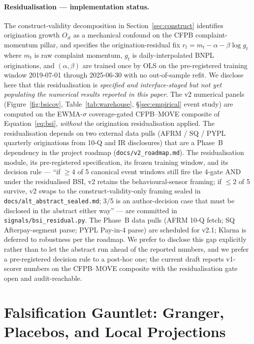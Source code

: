 \documentclass[11pt,letterpaper]{article}
\begin{document}
\paragraph{Residualisation --- implementation status.}
The construct-validity decomposition in Section~\ref{sec:construct}
identifies origination growth $O_{it}$ as a mechanical confound on
the CFPB complaint-momentum pillar, and specifies the
origination-residual fix
\mbox{$r_t = m_t - \alpha - \beta \log g_t$} where $m_t$ is raw
complaint momentum, $g_t$ is daily-interpolated BNPL originations,
and $(\alpha,\beta)$ are trained once by OLS on the pre-registered
training window \mbox{2019-07-01} through \mbox{2025-06-30} with no
out-of-sample refit. We disclose here that this residualisation is
\emph{specified and interface-staged but not yet populating the
numerical results reported in this paper}. The v2 numerical panels
(Figure~\ref{fig:bsicov}, Table~\ref{tab:warehouse},
\S\ref{sec:empirical} event study) are computed on the EWMA-$\sigma$
coverage-gated CFPB--MOVE composite of Equation~\eqref{eq:bsi},
\emph{without} the origination residualisation applied. The
residualisation depends on two external data pulls
(AFRM / SQ / PYPL quarterly originations from 10-Q and IR
disclosures) that are a Phase~B dependency in the project roadmap
(\texttt{docs/v2\_roadmap.md}). The residualisation module, its
pre-registered specification, its frozen training window, and its
decision rule --- ``if $\ge 4$ of 5 canonical event windows still
fire the 4-gate AND under the residualised BSI, v2 retains the
behavioural-sensor framing; if $\le 2$ of 5 survive, v2 swaps to
the construct-validity-only framing sealed in
\texttt{docs/alt\_abstract\_sealed.md}; 3/5 is an author-decision
case that must be disclosed in the abstract either way'' --- are
committed in \texttt{signals/bsi\_residual.py}. The Phase~B data
pulls (AFRM 10-Q fetch; SQ Afterpay-segment parse; PYPL Pay-in-4
parse) are scheduled for v2.1; Klarna is deferred to robustness
per the roadmap. We prefer to disclose this gap explicitly rather
than to let the abstract run ahead of the reported numbers, and we
prefer a pre-registered decision rule to a post-hoc one; the
current draft reports v1-scorer numbers on the CFPB--MOVE composite
with the residualisation gate open and audit-reachable.


\section{Falsification Gauntlet: Granger, Placebos, and Local
Projections}
\label{sec:granger}
\end{document}
